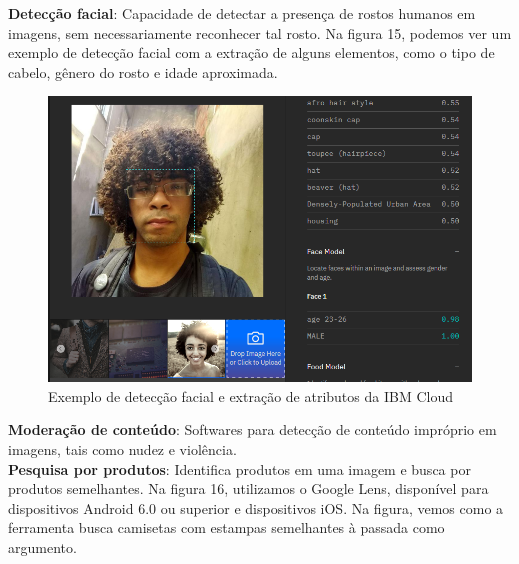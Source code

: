 \documentclass{article}
\begin{document}
\textbf{Detecção facial}: Capacidade de detectar a presença de rostos humanos em imagens, sem necessariamente reconhecer tal rosto. Na figura 15, podemos ver um exemplo de detecção facial com a extração de alguns elementos, como o tipo de cabelo, gênero do rosto e idade aproximada.\\
\begin{figure}[H]
    \centering
    \includegraphics[scale=0.29]{imagens/caracteristicas_watson_visual_recog.png}
    \caption{Exemplo de detecção facial e extração de atributos da IBM Cloud}
    \label{fig:detecção_facial}
\end{figure}{}
\textbf{Moderação de conteúdo}: Softwares para detecção de conteúdo impróprio em imagens, tais como nudez e violência. \\
\textbf{Pesquisa por produtos}: Identifica produtos em uma imagem e busca por produtos semelhantes. Na figura 16, utilizamos o Google Lens, disponível para dispositivos Android 6.0 ou superior e dispositivos iOS. Na figura, vemos como a ferramenta busca camisetas com estampas semelhantes à passada como argumento. \\
\end{document}
